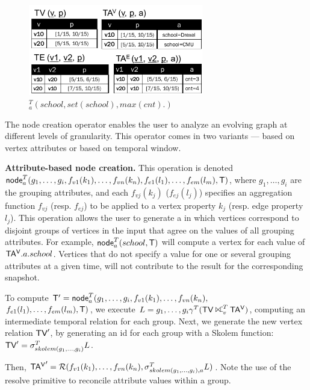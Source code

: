 \begin{figure}[b]
\includegraphics[width=3in]{figs/agg3.pdf}
\vspace{-0.2cm}
\caption{$^T_a(school, set(school), max(cnt).)$}
\vspace{-0.4cm}
\label{fig:tg_agg3}
\end{figure}

The node creation operator enables the user to analyze an evolving
graph at different levels of granularity.  This operator comes in two
variants --- based on vertex attributes or based on temporal window.

{\bf Attribute-based node creation.}  This operation is denoted
$\textsf{node}^T_a(g_1,\ldots,g_i,f_{v1}(k_1),\ldots,f_{vn}(k_n),f_{e1}(l_1),\ldots,f_{em}(l_m),\mathsf{T})$,
where $g_1,\ldots,g_i$ are the grouping attributes, and each
$f_{vj}(k_j)$ ($f_{ej}(l_j)$) specifies an aggregation function
$f_{vj}$ (resp. $f_{ej}$) to be applied to a vertex property $k_j$
(resp. edge property $l_j$).  This operation allows the user to
generate a \tg in which vertices correspond to disjoint groups of
vertices in the input that agree on the values of all grouping
attributes.  For example, $\textsf{node}^T_a(school,\mathsf{T})$ will compute
a vertex for each value of $\mathsf{TA^{V}}.a.school$.  Vertices that do not
specify a value for one or several grouping attributes at a given
time, will not contribute to the result for the corresponding
snapshot.

To compute $\mathsf{T}' =
\textsf{node}^T_a(g_1,\ldots,g_i,f_{v1}(k_1),\ldots,f_{vn}(k_n),$
\\ $f_{e1}(l_1),\ldots,f_{em}(l_m),\mathsf{T})$, we execute $L =
g_1,\ldots,g_i \gamma^T (\tv \rightouterjoin^T_v \tav)$, computing an
intermediate temporal relation for each group.  Next, we generate the
new vertex relation $\textsf{TV}'$, by generating an id for each group with a
Skolem function: $\textsf{TV}' = \sigma^T_{skolem(g_1,\ldots,g_i)}L$.

Then, $\mathsf{TA^{V}}' = \mathcal{R}(f_{v1}(k_1), \ldots,
  f_{vn}(k_n),\sigma^T_{skolem(g_1,\ldots,g_i), a} L)$.  Note the use
of the resolve primitive to reconcile attribute values within a group.

